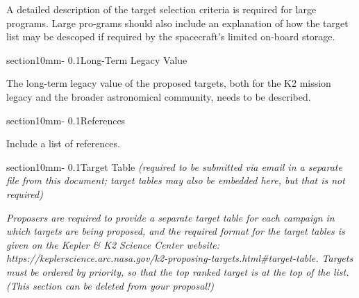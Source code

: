 \documentclass[letterpaper,11pt]{article}
\makeatletter
\renewcommand{\section}{\@startsection%
{section}{1}{0mm}{-\baselineskip}%
{0.1\baselineskip}{\normalfont\bfseries}}%
\makeatother
\begin{document}
A detailed description of the target selection criteria is required for large programs. Large pro-grams should also include an explanation of how the target list may be descoped if required by the spacecraft’s limited on-board storage. 

\section{Long-Term Legacy Value}

The long-term legacy value of the proposed targets, both for the K2 mission legacy and the broader astronomical community, needs to be described.

\section{References}

Include a list of references.

\section{Target Table \textit{(required to be submitted via email in a separate file from this document; target tables may also be embedded here, but that is not required)}}

\textit{Proposers are required to provide a separate target table for each campaign in which targets are being proposed, and the required format for the target tables is given on the Kepler \& K2 Science Center website: https://keplerscience.arc.nasa.gov/k2-proposing-targets.html\#target-table. Targets must be ordered by priority, so that the top ranked target is at the top of the list. (This section can be deleted from your proposal!)}


\end{document}
